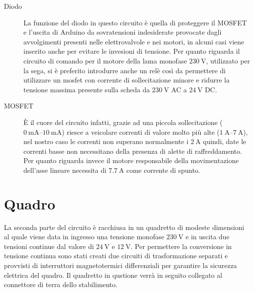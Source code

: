 \documentclass{report}
\begin{document}
\begin{description}
\item[Diodo] La funzione del diodo in questo circuito è quella di proteggere il MOSFET e l'uscita di Arduino da sovratensioni indesiderate provocate dagli avvolgimenti presenti nelle elettrovalvole e nei motori, in alcuni casi viene inserito anche per evitare le invesioni di tensione. Per quanto riguarda il circuito di comando per il motore della lama monofase $\SI{230}{\volt}$, utilizzato per la sega, si è preferito introdurre anche un relè così da permettere di utilizzare un mosfet con corrente di sollecitazione minore e ridurre la tensione massima presente sulla scheda da $\SI{230}{\volt}$ AC a $\SI{24}{\volt}$ DC.
\item[MOSFET] È il cuore del circuito infatti, grazie ad una piccola sollecitazione ($\SIrange{0}{10}{\milli\ampere}$) riesce a veicolare correnti di valore molto più alte ($\SIrange{1}{7}{\ampere}$), nel nostro caso le correnti non superano normalmente i $\SI{2}{\ampere}$ quindi, date le correnti basse non necessitano della presenza di alette di raffreddamento. Per quanto riguarda invece il motore responsabile della movimentazione dell'asse lineare necessita di $\SI{7,7}{\ampere}$ come corrente di spunto.
\end{description}
\section{Quadro}
La seconda parte del circuito è racchiusa in un quadretto di modeste dimensioni al quale viene data in ingresso una tensione monofase $\SI{230}{\volt}$ e in uscita due tensioni continue dal valore di $\SI{24}{\volt}$ e $\SI{12}{\volt}$.
Per permettere la conversione in tensione continua sono stati creati due circuiti di trasformazione separati e provvisti di interruttori magnetotermici differenziali per garantire la sicurezza elettrica del quadro.
Il quadretto in qustione verrà in seguito collegato al connettore di terra dello stabilimento.
\end{document}
